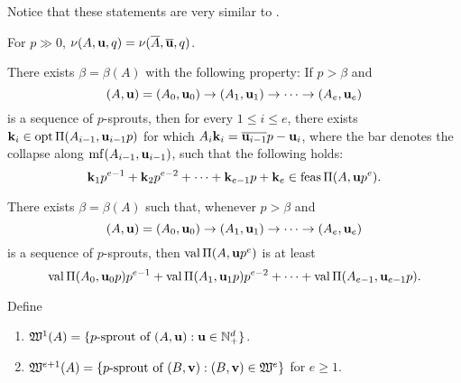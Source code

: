 \documentclass[11pt]{amsart}
\begin{document}
Notice that these statements are very similar to . 

\begin{corollary}
For $p \gg 0$, 
 $\nu(A, \mathbf{u}, q) = \nu(\overline{A}, \overline{\mathbf{u}}, q)$. 
\end{corollary}


\begin{lemma}
 There exists $\beta = \beta(A)$ with the following property:  If $p > \beta$ and 
 \[
(A, \mathbf{u}) = (A_0, \mathbf{u}_0) \to (A_1, \mathbf{u}_1) \to \cdots \to (A_e, \mathbf{u}_e)
 \]
 is a sequence of $p$-sprouts, then for every $1 \leq i \leq e$, there exists $\mathbf{k}_i \in \operatorname{opt} \Pi(A_{i-1}, \mathbf{u}_{i-1} p)$ 
 for which $A_i \mathbf{k}_i = \overline{\mathbf{u}_{i-1}} p - \mathbf{u}_i$, where the bar denotes the collapse along $\operatorname{mf}(A_{i-1}, \mathbf{u}_{i-1})$, such that the following holds: 
 \[
  \mathbf{k}_1 p^{e-1} + \mathbf{k}_2 p^{e-2} + \cdots + \mathbf{k}_{e-1} p + \mathbf{k}_e \in \operatorname{feas} \Pi(A, \mathbf{u}p^e).
 \]
\end{lemma}

\begin{corollary}
There exists $\beta = \beta(A)$ such that, whenever $p > \beta$ and 
 \[
(A, \mathbf{u}) = (A_0, \mathbf{u}_0) \to (A_1, \mathbf{u}_1) \to \cdots \to (A_e, \mathbf{u}_e)
 \]
is a sequence of $p$-sprouts,
then $\operatorname{val} \Pi(A, \mathbf{u} p^e)$ is at least
\[
\operatorname{val} \Pi(A_0, \mathbf{u}_0 p) p^{e-1} + \operatorname{val} \Pi(A_1, \mathbf{u}_1 p) p^{e-2} + \cdots + \operatorname{val} \Pi(A_{e-1}, \mathbf{u}_{e-1} p).
\]
\end{corollary}


\begin{definition}
 Define
\begin{enumerate}
\item $\mathfrak{W}^1(A) = \{ p\text{-sprout of } (A, \mathbf{u}) : \mathbf{u} \in \mathbb{N}_+^d \}$.
\item $\mathfrak{W}^{e+1}(A) = \{ p\text{-sprout of } (B, \mathbf{v}) : (B, \mathbf{v}) \in \mathfrak{W}^e  \}$ for $e \geq 1$. 
\end{enumerate}
\end{definition}
\end{document}
